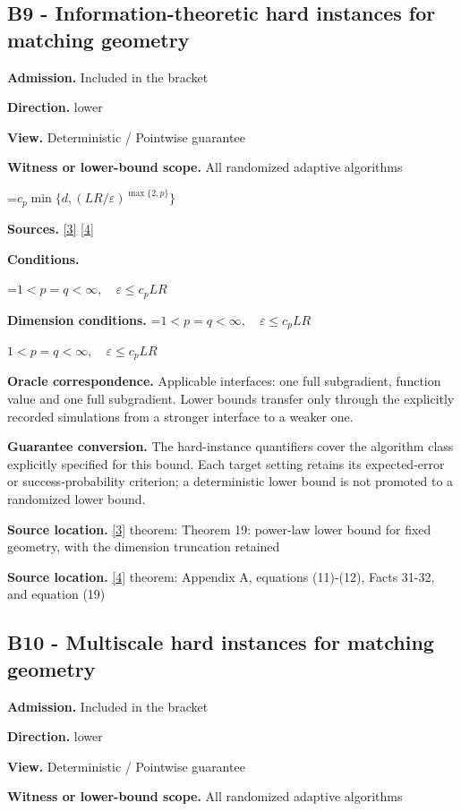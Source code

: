 \documentclass[10pt,a4paper]{article}
\newcommand{\AtlasMath}[1]{\par\begingroup\centering\setbox0=\hbox{$\displaystyle #1$}\ifdim\wd0>1.4\linewidth\typeout{ATLAS WIDE FORMULA: \the\wd0}\fi\ifdim\wd0>\linewidth\resizebox{\linewidth}{!}{\box0}\else\box0\fi\par\endgroup}
\newcommand{\AtlasInlineMath}[1]{\begingroup\setbox0=\hbox{$#1$}\ifdim\wd0>.4\linewidth\endgroup\AtlasMath{#1}\else\endgroup$#1$\fi}
\begin{document}
\subsection{B9 - Information-theoretic hard instances for matching geometry}
\textbf{Admission.} Included in the bracket

\textbf{Direction.} lower

\textbf{View.} Deterministic / Pointwise guarantee

\textbf{Witness or lower-bound scope.} All randomized adaptive algorithms

\AtlasMath{c_p\min\{d,(LR/\varepsilon)^{\max\{2,p\}}\}}
\textbf{Sources.} \href{https://arxiv.org/pdf/2609.20701}{[3]} \href{https://arxiv.org/pdf/2609.20687}{[4]}

\textbf{Conditions.} 
\AtlasMath{1<p=q<\infty,\quad\varepsilon\le c_p LR}


\textbf{Dimension conditions.} \AtlasInlineMath{1<p=q<\infty,\quad\varepsilon\le c_p LR}

\textbf{Oracle correspondence.} Applicable interfaces: one full subgradient, function value and one full subgradient. Lower bounds transfer only through the explicitly recorded simulations from a stronger interface to a weaker one.

\textbf{Guarantee conversion.} The hard-instance quantifiers cover the algorithm class explicitly specified for this bound. Each target setting retains its expected-error or success-probability criterion; a deterministic lower bound is not promoted to a randomized lower bound.

\textbf{Source location.} \href{https://arxiv.org/pdf/2609.20701}{[3]} theorem: Theorem 19: power-law lower bound for fixed geometry, with the dimension truncation retained

\textbf{Source location.} \href{https://arxiv.org/pdf/2609.20687}{[4]} theorem: Appendix A, equations (11)-(12), Facts 31-32, and equation (19)

\subsection{B10 - Multiscale hard instances for matching geometry}
\textbf{Admission.} Included in the bracket

\textbf{Direction.} lower

\textbf{View.} Deterministic / Pointwise guarantee

\textbf{Witness or lower-bound scope.} All randomized adaptive algorithms
\end{document}
